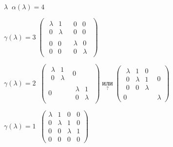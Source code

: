\documentclass[../main.tex]{subfiles}
\begin{document}
	\begin{examples}
		$\lambda \; \; \alpha(\lambda) = 4$\\
		\begin{mylist}
			\item 
			$\gamma(\lambda) = 3 \; \begin{pmatrix}
				\boxed{\begin{matrix}
						\lambda & 1\\
						0 & \lambda
					\end{matrix}} & \begin{matrix}
					0 & 0\\ 0 & 0
			\end{matrix}\\
			\begin{matrix}
				0 & 0\\ 0 & 0
			\end{matrix} & \begin{matrix}
				\boxed \lambda & 0\\ 0 & \boxed \lambda
			\end{matrix}
			\end{pmatrix}$
			\item $\gamma(\lambda) = 2 \; \; \begin{pmatrix}
				\boxed{\begin{matrix}
						\lambda & 1\\ 0 & \lambda
					\end{matrix}} & 0\\
				0 & \boxed{\begin{matrix}
						\lambda & 1 \\ 0 & \lambda
					\end{matrix}}
			\end{pmatrix} \; \underset{?}{\text{или}} \; 
			\begin{pmatrix}
				\boxed{
					\begin{matrix}
						\lambda & 1 & 0\\
						0 & \lambda & 1\\
						0 & 0 & \lambda
					\end{matrix}} & 0\\
					0 & \boxed \lambda
			\end{pmatrix}$
			 \item $\gamma(\lambda) = 1 \; \; \begin{pmatrix}
				 \lambda & 1 & 0 & 0\\
				 0 & \lambda & 1 & 0\\
				 0 & 0 & \lambda & 1\\
				 0 & 0 & 0 & 0
			 \end{pmatrix}$
		\end{mylist}
	\end{examples}
\end{document}

